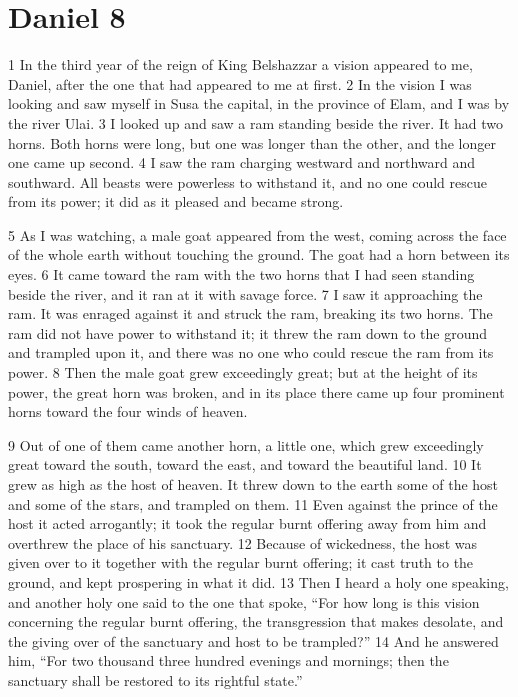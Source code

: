 \chapter{Daniel 8}
\label{ch:daniel8}

1 In the third year of the reign of King Belshazzar a vision appeared to me, 
Daniel, after the one that had appeared to me at first. 2 In the vision I was 
looking and saw myself in Susa the capital, in the province of Elam, and I was 
by the river Ulai. 3 I looked up and saw a ram standing beside the river. It
had two horns. Both horns were long, but one was longer than the other, and 
the longer one came up second. 4 I saw the ram charging westward and northward 
and southward. All beasts were powerless to withstand it, and no one could 
rescue from its power; it did as it pleased and became strong.

5 As I was watching, a male goat appeared from the west, coming across the face 
of the whole earth without touching the ground. The goat had a horn between its 
eyes. 6 It came toward the ram with the two horns that I had seen standing beside 
the river, and it ran at it with savage force. 7 I saw it approaching the ram. 
It was enraged against it and struck the ram, breaking its two horns. The ram did 
not have power to withstand it; it threw the ram down to the ground and trampled 
upon it, and there was no one who could rescue the ram from its power. 8 Then 
the male goat grew exceedingly great; but at the height of its power, the great 
horn was broken, and in its place there came up four prominent horns toward the 
four winds of heaven.

9 Out of one of them came another horn, a little one, which grew exceedingly 
great toward the south, toward the east, and toward the beautiful land. 10 It 
grew as high as the host of heaven. It threw down to the earth some of the host 
and some of the stars, and trampled on them. 11 Even against the prince of the 
host it acted arrogantly; it took the regular burnt offering away from him and 
overthrew the place of his sanctuary. 12 Because of wickedness, the host was 
given over to it together with the regular burnt offering; it cast truth to 
the ground, and kept prospering in what it did. 13 Then I heard a holy one 
speaking, and another holy one said to the one that spoke, ``For how long is this 
vision concerning the regular burnt offering, the transgression that makes 
desolate, and the giving over of the sanctuary and host to be trampled?'' 14 And 
he answered him, ``For two thousand three hundred evenings and mornings; then 
the sanctuary shall be restored to its rightful state.''

